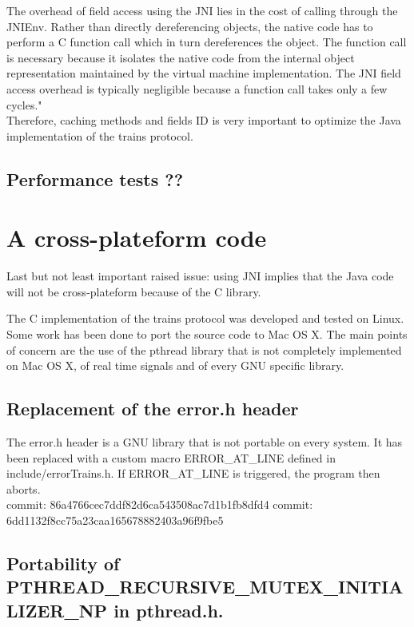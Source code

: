 \documentclass[a4paper,10pt]{report}
\begin{document}
The overhead of field access using the JNI lies in the cost of calling through the JNIEnv. Rather than directly dereferencing objects, 
the native code has to perform a C function call which in turn dereferences the object. The function call is necessary because it 
isolates the native code from the internal object representation maintained by the virtual machine implementation. The JNI field 
access overhead is typically negligible because a function call takes only a few cycles."\\

Therefore, caching methods and fields ID is very important to optimize the Java implementation of the trains protocol.

\subsection{Performance tests ??}

\section{A cross-plateform code}

Last but not least important raised issue: using JNI implies that the Java code will not be cross-plateform because of the C library.

The C implementation of the trains protocol was developed and tested on Linux. Some work has been done to port the source code
to Mac OS X. The main points of concern are the use of the pthread library that is not completely implemented on Mac OS X, 
of real time signals and of every GNU specific library. 

\subsection{Replacement of the error.h header}
    The error.h header is a GNU library that is not portable on every
    system. It has been replaced with a custom macro ERROR\_AT\_LINE defined
    in include/errorTrains.h.
    If ERROR\_AT\_LINE is triggered, the program then aborts.\\

    commit: 86a4766cec7ddf82d6ca543508ac7d1b1fb8dfd4
    commit: 6dd1132f8cc75a23caa165678882403a96f9fbe5

\subsection{Portability of PTHREAD\_RECURSIVE\_MUTEX\_INITIALIZER\_NP in pthread.h.}
\end{document}
